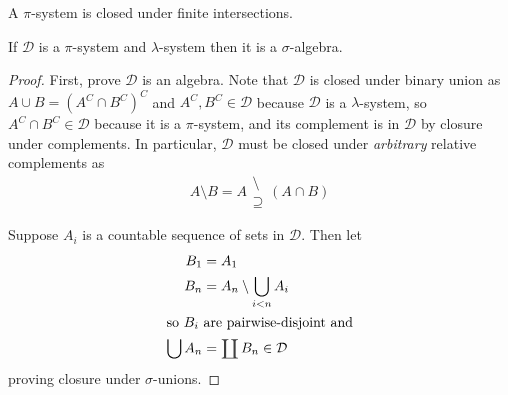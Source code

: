 \documentclass{scrartcl}
\newcommand{\system}{\mathcal D}
\newcommand{\propersetminus}{\begin{smallmatrix} \setminus\\\supseteq \end{smallmatrix}}%
\DeclareMathOperator*{\bigdisjunion}{\coprod}
\begin{document}
\begin{defn}[\(\pi\)-system]
  A \(\pi\)-system is closed under finite intersections.
\end{defn}
\begin{theorem}
  If \(\system\) is a \(\pi\)-system and \(\lambda\)-system then it is a \(\sigma\)-algebra.
\end{theorem}
\begin{proof}
  First, prove \(\system\) is an algebra.
  Note that \(\system\) is closed under binary union as \(A\cup B = (A^C\cap
  B^C)^C \) and \(A^C,B^C\in\system\) because \(\system\) is a \(\lambda\)-system, so
  \(A^C\cap B^C\in\system\) because it is a \(\pi\)-system, and its complement is in
  \(\system\) by closure under complements. In particular, \(\system\) must be
  closed under \emph{arbitrary} relative complements as
  \[
    A\setminus B = A\propersetminus ({A\cap B})
  \]

  Suppose \(A_i\) is a countable sequence of sets in \(\system\). Then let
  \begin{align*}
    B_1 &= A_1 \\
    B_n &= A_n \setminus \bigcup_{i<n}A_{i} \\
    \shortintertext{so \(B_i\) are pairwise-disjoint and}
    \bigcup A_n &= \bigdisjunion B_n \in \system
  \end{align*}
  proving closure under \(\sigma\)-unions.
\end{proof}
\end{document}
